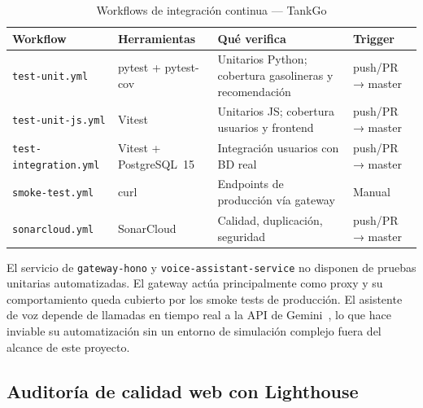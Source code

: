 \begin{table}[H]
  \centering
  \caption{Workflows de integración continua — TankGo}
  \label{tab:ci-workflows}
  \begin{tabular}{p{4.2cm} p{3.2cm} p{4.5cm} p{2.3cm}}
    \toprule
    \textbf{Workflow} & \textbf{Herramientas}                                   & \textbf{Qué verifica} & \textbf{Trigger} \\
    \midrule
    \texttt{test-unit.yml}
                      & pytest + pytest-cov
                      & Unitarios Python; cobertura gasolineras y recomendación
                      & push/PR → master                                                                                   \\[4pt]
    \texttt{test-unit-js.yml}
                      & Vitest
                      & Unitarios JS; cobertura usuarios y frontend
                      & push/PR → master                                                                                   \\[4pt]
    \texttt{test-integration.yml}
                      & Vitest + PostgreSQL~15
                      & Integración usuarios con BD real
                      & push/PR → master                                                                                   \\[4pt]
    \texttt{smoke-test.yml}
                      & curl
                      & Endpoints de producción vía gateway
                      & Manual                                                                                             \\[4pt]
    \texttt{sonarcloud.yml}
                      & SonarCloud
                      & Calidad, duplicación, seguridad
                      & push/PR → master                                                                                   \\
    \bottomrule
  \end{tabular}
\end{table}

El servicio de \texttt{gateway-hono} y \texttt{voice-assistant-service} no disponen de pruebas
unitarias automatizadas. El gateway actúa principalmente como proxy y su comportamiento queda
cubierto por los smoke tests de producción. El asistente de voz depende de llamadas en tiempo
real a la API de Gemini~\cite{gemini_2_5}, lo que hace inviable su automatización sin un
entorno de simulación complejo fuera del alcance de este proyecto.

\subsection{Auditoría de calidad web con Lighthouse}
\label{subsec:lighthouse}

